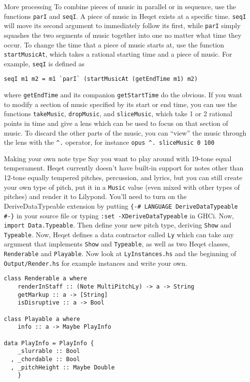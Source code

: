 \documentclass{article}
\begin{document}
\begin{section}{More processing}
To combine pieces of music in parallel or in sequence, use the functions \verb+parI+ and \verb+seqI+. A piece of music in Heqet exists at a specific time. \verb+seqI+ will move its second argument to immediately follow its first, while \verb+parI+ simply squashes the two segments of music together into one no matter what time they occur. To change the time that a piece of music starts at, use the function \verb+startMusicAt+, which takes a rational starting time and a piece of music. For example, \verb+seqI+ is defined as

\begin{verbatim}
seqI m1 m2 = m1 `parI` (startMusicAt (getEndTime m1) m2)
\end{verbatim}

where \verb+getEndTime+ and its companion \verb+getStartTime+ do the obvious. If you want to modify a section of music specified by its start or end time, you can use the functions \verb+takeMusic+, \verb+dropMusic+, and \verb+sliceMusic+, which take 1 or 2 rational points in time and give a lens which can be used to focus on that section of music. To discard the other parts of the music, you can ``view'' the music through the lens with the \verb+^.+ operator, for instance \verb+opus ^. sliceMusic 0 100+
\end{section}


\begin{section}{Making your own note type}
Say you want to play around with 19-tone equal temperament. Heqet currently doesn't have built-in support for notes other than 12-tone equally tempered pitches, percussion, and lyrics, but you can still create your own type of pitch, put it in a \verb+Music+ value (even mixed with other types of pitches) and render it to Lilypond. You'll need to turn on the DeriveDataTypeable extension by putting 
\verb+{-# LANGUAGE DeriveDataTypeable #-}+ in your source file or typing \verb+:set -XDeriveDataTypeable+ in GHCi. Now, \verb+import Data.Typeable+. Then define your new pitch type, deriving \verb+Show+ and \verb+Typeable+. Now, Heqet defines a data contractor called \verb+Ly+ which can take any argument that implements \verb+Show+ and \verb+Typeable+, as well as two Heqet classes, \verb+Renderable+ and \verb+Playable+. Now look at \verb+LyInstances.hs+ and the beginning of \verb+Output/Render.hs+ for example instances and write your own.

\begin{verbatim}
class Renderable a where
    renderInStaff :: (Note MultiPitchLy) -> a -> String
    getMarkup :: a -> [String]
    isDisruptive :: a -> Bool

class Playable a where
    info :: a -> Maybe PlayInfo

data PlayInfo = PlayInfo {
    _slurrable :: Bool
  , _chordable :: Bool
  , _pitchHeight :: Maybe Double
    }
\end{verbatim}



\end{section}
\end{document}
